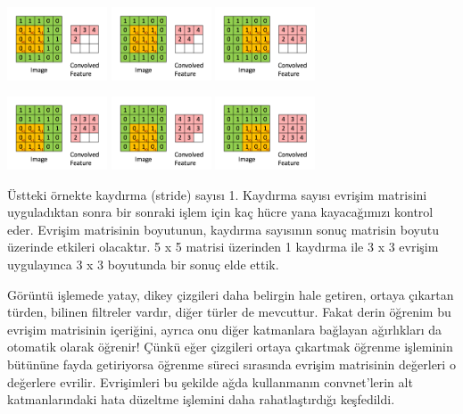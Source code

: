 \documentclass[12pt,fleqn]{article}\usepackage{../../common}
\begin{document}
\includegraphics[width=8em]{conv-3.png}
\hspace{1cm}
\includegraphics[width=8em]{conv-4.png}
\hspace{1cm}
\includegraphics[width=8em]{conv-5.png}

\includegraphics[width=8em]{conv-6.png}
\hspace{1cm}
\includegraphics[width=8em]{conv-7.png}
\hspace{1cm}
\includegraphics[width=8em]{conv-8.png}

Üstteki örnekte kaydırma (stride) sayısı 1. Kaydırma sayısı evrişim
matrisini uyguladıktan sonra bir sonraki işlem için kaç hücre yana
kayacağımızı kontrol eder. Evrişim matrisinin boyutunun, kaydırma sayısının
sonuç matrisin boyutu üzerinde etkileri olacaktır. 5 x 5 matrisi üzerinden
1 kaydırma ile 3 x 3 evrişim uygulayınca 3 x 3 boyutunda bir sonuç elde
ettik. 

Görüntü işlemede yatay, dikey çizgileri daha belirgin hale getiren, ortaya
çıkartan türden, bilinen filtreler vardır, diğer türler de mevcuttur.  Fakat
derin öğrenim bu evrişim matrisinin içeriğini, ayrıca onu diğer katmanlara
bağlayan ağırlıkları da otomatik olarak öğrenir!  Çünkü eğer çizgileri
ortaya çıkartmak öğrenme işleminin bütününe fayda getiriyorsa öğrenme
süreci sırasında evrişim matrisinin değerleri o değerlere
evrilir. Evrişimleri bu şekilde ağda kullanmanın convnet'lerin alt
katmanlarındaki hata düzeltme işlemini daha rahatlaştırdığı keşfedildi.
\end{document}
